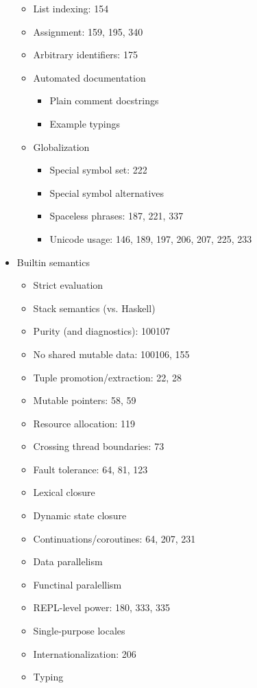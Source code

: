 \begin{itemize}
\begin{itemize}
  \item List indexing: 154
  \item Assignment: 159, 195, 340
  \item Arbitrary identifiers: 175
  \item Automated documentation
    \begin{itemize}
    \item Plain comment docstrings
    \item Example typings
    \end{itemize}
  \item Globalization
    \begin{itemize}
    \item Special symbol set: 222
    \item Special symbol alternatives
    \item Spaceless phrases: 187, 221, 337
    \item Unicode usage: 146, 189, 197, 206, 207, 225, 233
    \end{itemize}
  \end{itemize}
\item Builtin semantics
  \begin{itemize}
  \item Strict evaluation
  \item Stack semantics (vs. Haskell)
  \item Purity (and diagnostics): 100107
  \item No shared mutable data: 100106, 155
  \item Tuple promotion/extraction: 22, 28
  \item Mutable pointers: 58, 59
  \item Resource allocation: 119
  \item Crossing thread boundaries: 73
  \item Fault tolerance: 64, 81, 123
  \item Lexical closure
  \item Dynamic state closure
  \item Continuations/coroutines: 64, 207, 231
  \item Data parallelism
  \item Functinal paralellism
  \item REPL-level power: 180, 333, 335
  \item Single-purpose locales
  \item Internationalization: 206
  \item Typing
    \begin{itemize}

\end{itemize}
\end{itemize}
\end{itemize}
